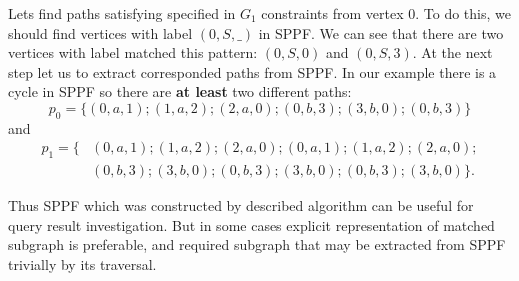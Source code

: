 Lets find paths satisfying specified in $G_1$ constraints from vertex $0$.
To do this, we should find vertices with label $(0, S, \_)$ in SPPF.
We can see that there are two vertices with label matched this pattern: $(0, S, 0)$ and $(0, S, 3)$.
At the next step let us to extract corresponded paths from SPPF.
In our example there is a cycle in SPPF so there are \textbf{at least} two different paths: $$p_0=\{(0,a,1);(1,a,2);(2,a,0);(0,b,3);(3,b,0);(0,b,3)\}$$ and 
\begin{align*}
p_1=\{&(0,a,1);(1,a,2);(2,a,0);(0,a,1);(1,a,2);(2,a,0);\\ &(0,b,3);(3,b,0);(0,b,3);(3,b,0);(0,b,3);(3,b,0)\}.
\end{align*}


Thus SPPF which was constructed by described algorithm can be useful for query result investigation. 
But in some cases explicit representation of matched subgraph is preferable, and required subgraph that may be extracted from SPPF trivially by its traversal.
